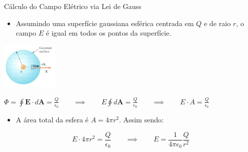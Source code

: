 \documentclass{beamer}
\begin{document}
  \begin{frame}{Cálculo do Campo Elétrico via Lei de Gauss}

    \begin{itemize}
      \item Assumindo uma superfície gaussiana esférica centrada em $Q$ e de raio $r$, o campo $E$ é igual em todos os pontos da superfície.
    \end{itemize}

    \center \includegraphics[width=0.2\textwidth]{images/lei_de_gauss.png}

    $\Phi = \oint \mathbf{E} \cdot d\mathbf{A} = \frac{Q}{\epsilon_0} \qquad \implies \qquad E \oint d\mathbf{A} = \frac{Q}{\epsilon_0} \qquad \implies \qquad E \cdot A = \frac{Q}{\epsilon_0}$

    \begin{itemize}
      \item A área total da esfera é $A = 4\pi r^2$. Assim sendo:
    \end{itemize}
      
    \[ E \cdot 4 \pi r^2 = \frac{Q}{\epsilon_0} \qquad \implies \qquad E = \frac{1}{4 \pi \epsilon_0} \frac{Q}{r^2} \]
    
  \end{frame}
  
  
\end{document}
